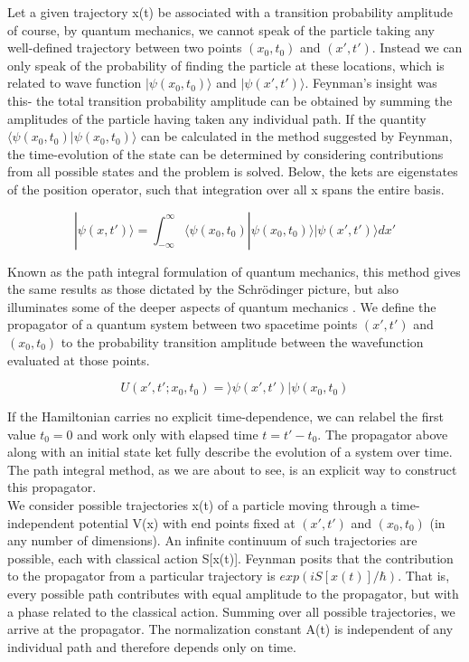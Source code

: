\documentclass[14pt]{extarticle}
\begin{document}
Let a given trajectory x(t) be associated with a transition probability amplitude of course, by quantum mechanics, we cannot speak of the particle taking any well-defined trajectory between two points $(x_0,t_0)$ and $(x',t')$. Instead we can only speak of the probability of finding the particle at these locations, which is related to wave function $|\psi(x_0,t_0)\rangle$ and $|\psi(x',t')\rangle$. Feynman's insight was this- the total transition probability amplitude can be obtained by summing the amplitudes of the particle having taken any individual path. If the quantity $\langle \psi(x_0,t_0)|\psi(x_0,t_0)\rangle$ can be calculated in the method suggested by Feynman, the time-evolution of the state can be determined by considering contributions from all possible states and the problem is solved. Below, the kets are eigenstates of the position operator, such that integration over all x spans the entire basis.

$$|\psi (x,t') \rangle = \int_{-\infty}^{\infty} \langle \psi(x_0,t_0)|\psi(x_0,t_0)\rangle |\psi(x',t')\rangle dx'  $$


Known as the path integral formulation of quantum mechanics, this method gives the same results as those dictated by the Schrödinger picture, but also illuminates some of the deeper aspects of quantum mechanics . We define the propagator of a quantum system between two spacetime points $(x',t')$ and $(x_0,t_0)$ to the probability transition amplitude between the wavefunction evaluated at those points.

$$U(x',t';x_0,t_0) = \rangle \psi (x',t')| \psi (x_0,t_0)$$

If the Hamiltonian carries no explicit time-dependence, we can relabel the first value $t_0=0$ and work only with elapsed time $t=t'-t_0$. The propagator above along with an initial state ket fully describe the evolution of a system over time. The path integral method, as we are about to see, is an explicit way to construct this propagator.\\
We consider possible trajectories x(t) of a particle moving through a time-independent potential V(x) with end points fixed at $(x',t')$ and $(x_0,t_0)$ (in any number of dimensions). An infinite continuum of such trajectories are possible, each with classical action S[x(t)]. Feynman posits that the contribution to the propagator from a particular trajectory is $exp(iS[x(t)]/\hbar)$. That is, every possible path contributes with equal amplitude to the propagator, but with a phase related to the classical action. Summing over all possible trajectories, we arrive at the propagator. The normalization constant A(t) is independent of any individual path and therefore depends only on time.
\end{document}
